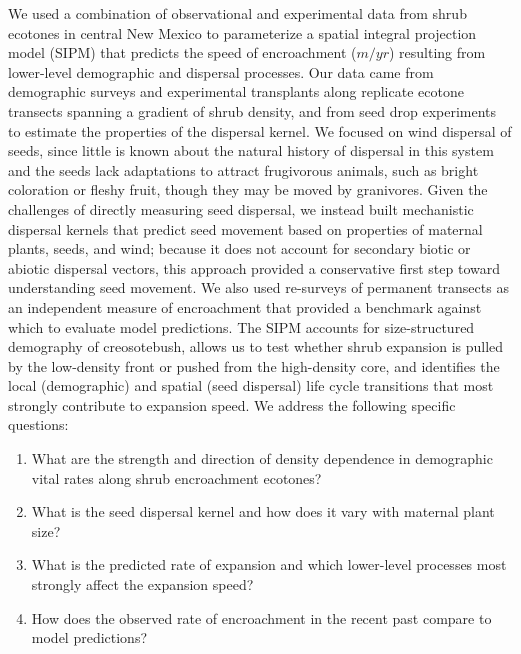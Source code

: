 \documentclass[11pt]{article}\usepackage[]{graphicx}\usepackage[usenames,dvipsnames]{xcolor}
\begin{document}
We used a combination of observational and experimental data from shrub ecotones in central New Mexico to parameterize a spatial integral projection model (SIPM) that predicts the speed of encroachment ($m/yr$) resulting from lower-level demographic and dispersal processes. 
Our data came from demographic surveys and experimental transplants along replicate ecotone transects spanning a gradient of shrub density, and from seed drop experiments to estimate the properties of the dispersal kernel.
We focused on wind dispersal of seeds, since little is known about the natural history of dispersal in this system and the seeds lack adaptations to attract frugivorous animals, such as bright coloration or fleshy fruit, though they may be moved by granivores.
Given the challenges of directly measuring seed dispersal, we instead built mechanistic dispersal kernels that predict seed movement based on properties of maternal plants, seeds, and wind; because it does not account for secondary biotic or abiotic dispersal vectors, this approach provided a conservative first step toward understanding seed movement.
We also used re-surveys of permanent transects as an independent measure of encroachment that provided a benchmark against which to evaluate model predictions. 
The SIPM accounts for size-structured demography of creosotebush, allows us to test whether shrub expansion is pulled by the low-density front or pushed from the high-density core, and identifies the local (demographic) and spatial (seed dispersal) life cycle transitions that most strongly contribute to expansion speed. 
We address the following specific questions: 
\begin{enumerate}
\item What are the strength and direction of density dependence in demographic vital rates along shrub encroachment ecotones?
\item What is the seed dispersal kernel and how does it vary with maternal plant size?
\item What is the predicted rate of expansion and which lower-level processes most strongly affect the expansion speed?
\item How does the observed rate of encroachment in the recent past compare to model predictions?

\end{enumerate}
\end{document}
